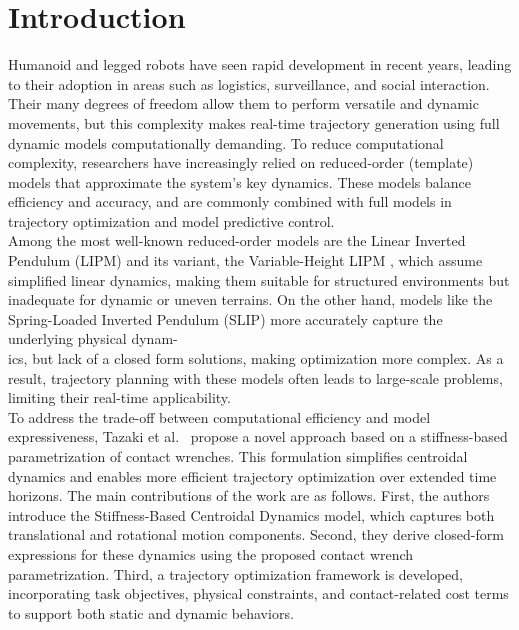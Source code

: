 \documentclass[main.tex]{subfiles}
\begin{document}
\begin{sloppypar}
\section{Introduction}
\label{sec:introduction}
Humanoid and legged robots have seen rapid development in recent years, leading to their adoption in areas such as logistics, surveillance, and social interaction. Their many degrees of freedom allow them to perform versatile and dynamic movements, but this complexity makes real-time trajectory generation using full dynamic models computationally demanding. To reduce computational complexity, researchers have increasingly relied on reduced-order (template) models that approximate the system’s key dynamics. These models balance efficiency and accuracy, and are commonly combined with full models in trajectory optimization and model predictive control. \\
Among the most well-known reduced-order models are the Linear Inverted Pendulum (LIPM) \cite{kajita1991study} and its variant, the Variable-Height LIPM \cite{caron2020biped}, which assume simplified linear dynamics, making them suitable for structured environments but inadequate for dynamic or uneven terrains. On the other hand, models like the Spring-Loaded Inverted Pendulum (SLIP) \cite{poulakakis2009spring} more accurately capture the underlying physical dynam-\\ics, but lack of a closed form solutions, making optimization more complex. As a result, trajectory planning with these models often leads to large-scale problems, limiting their real-time applicability.\\
To address the trade-off between computational efficiency and model expressiveness, Tazaki et al.~\cite{tazaki2024trajectory} propose a novel approach based on a stiffness-based parametrization of contact wrenches. This formulation simplifies centroidal dynamics and enables more efficient trajectory optimization over extended time horizons. The main contributions of the work are as follows. First, the authors introduce the Stiffness-Based Centroidal Dynamics model, which captures both translational and rotational motion components. Second, they derive closed-form expressions for these dynamics using the proposed contact wrench parametrization. Third, a trajectory optimization framework is developed, incorporating task objectives, physical constraints, and contact-related cost terms to support both static and dynamic behaviors.\\

\end{sloppypar}
\end{document}
